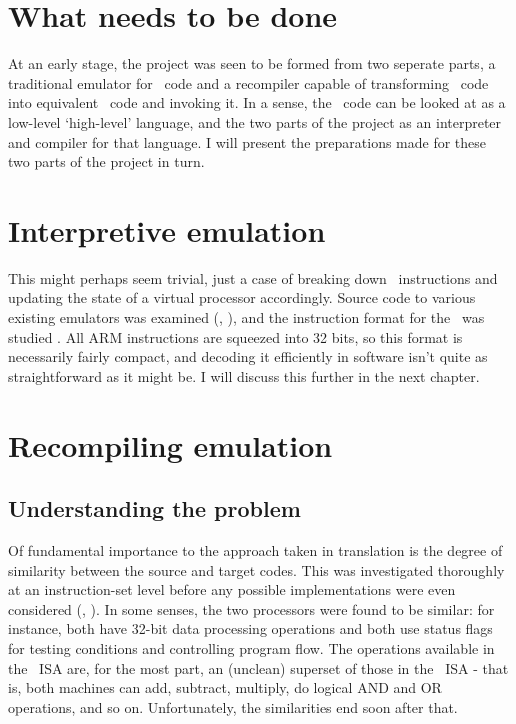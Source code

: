 \section{What needs to be done}

At an early stage, the project was seen to be formed from two seperate parts, a traditional emulator for \arm\ code and a recompiler capable of transforming \arm\ code into equivalent \ia\ code and invoking it. In a sense, the \arm\ code can be looked at as a low-level `high-level' language, and the two parts of the project as an interpreter and compiler for that language. I will present the preparations made for these two parts of the project in turn.

\section{Interpretive emulation}

This might perhaps seem trivial, just a case of breaking down \arm\ instructions and updating the state of a virtual processor accordingly. Source code to various existing emulators was examined (\cite{Dorr9X}, \cite{Gilbert9X}), and the instruction format for the \arm\ was studied \cite{ARM94}. All ARM instructions are squeezed into 32 bits, so this format is necessarily fairly compact, and decoding it efficiently in software isn't quite as straightforward as it might be. I will discuss this further in the next chapter.

\section{Recompiling emulation}

\subsection{Understanding the problem}

Of fundamental importance to the approach taken in translation is the degree of similarity between the source and target codes. This was investigated thoroughly at an instruction-set level before any possible implementations were even considered (\cite{HELPPC}, \cite{Intel99}). In some senses, the two processors were found to be similar: for instance, both have 32-bit data processing operations and both use status flags for testing conditions and controlling program flow. The operations available in the \ia\ ISA are, for the most part, an (unclean) superset of those in the \arm\ ISA - that is, both machines can add, subtract, multiply, do logical AND and OR operations, and so on. Unfortunately, the similarities end soon after that.

